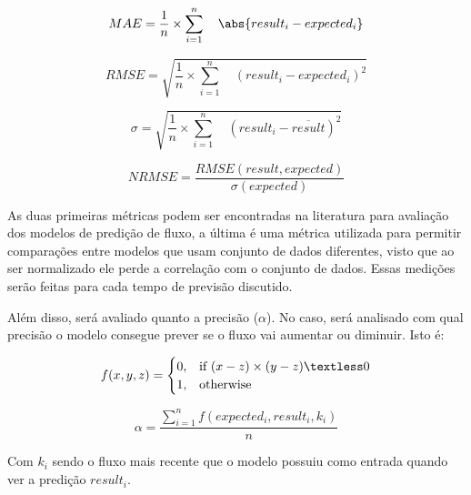 \begin{equation}
MAE = \frac{1}{n} \times \sum_{i=1}^{n} \quad \abs{result_i - expected_i}
\end{equation}

\begin{equation}
RMSE = \sqrt{ \frac{1}{n} \times \sum_{i=1}^{n} \quad (result_i - expected_i) ^ 2}
\end{equation}

\begin{equation}
\sigma = \sqrt{ \frac{1}{n} \times \sum_{i=1}^{n} \quad (result_i - \overline{result}) ^ 2}
\end{equation}

\begin{equation}
NRMSE = \frac{RMSE(result, expected)}{\sigma(expected)}
\end{equation}

As duas primeiras métricas podem ser encontradas na literatura para avaliação dos modelos de predição de fluxo, a última é uma métrica utilizada para permitir comparações entre modelos que usam conjunto de dados diferentes, visto que ao ser normalizado ele perde a correlação com o conjunto de dados. Essas medições serão feitas para cada tempo de previsão discutido.

Além disso, será avaliado quanto a precisão (\(\alpha\)). No caso, será analisado com qual precisão o modelo consegue prever se o fluxo vai aumentar ou diminuir. Isto é:

\begin{equation}
f(x, y, z) =
\begin{cases}
  0, & \text{if}\ (x - z) \times (y - z) \textless 0 \\
  1, & \text{otherwise}
\end{cases}
\end{equation}

\begin{equation}
\alpha = \frac{\sum_{i=1}^{n} f(expected_i, result_i, k_i)}{n}
\end{equation}

Com \(k_i\) sendo o fluxo mais recente que o modelo possuiu como entrada quando ver a predição \(result_i\).